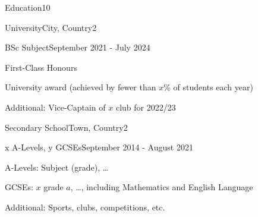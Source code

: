 \documentclass[10pt,a4paper]{CV}
\begin{document}

\begin{Section}{Education}{10}
    \begin{Institution}{University}{City, Country}{2}
        \begin{Position}{BSc Subject}{September 2021 - July 2024}
            \item First-Class Honours
            \item University award (achieved by fewer than $x$\% of students each year)
            \item Additional: Vice-Captain of $x$ club for 2022/23
        \end{Position}
    \end{Institution}

    \begin{Institution}{Secondary School}{Town, Country}{2}
        \begin{Position}{x A-Levels, y GCSEs}{September 2014 - August 2021}
            \item A-Levels: Subject (grade), \dots
            \item GCSEs: $x$ grade $a$, \dots, including Mathematics and English Language
            \item Additional: Sports, clubs, competitions, etc.
        \end{Position}
    \end{Institution}
\end{Section}
\end{document}
